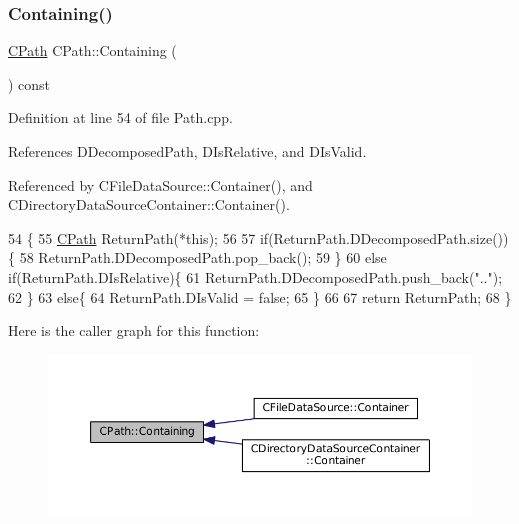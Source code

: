 \subsubsection{\texorpdfstring{Containing()}{Containing()}}
{\footnotesize\ttfamily \hyperlink{classCPath}{C\+Path} C\+Path\+::\+Containing (\begin{DoxyParamCaption}{ }\end{DoxyParamCaption}) const}



Definition at line 54 of file Path.\+cpp.



References D\+Decomposed\+Path, D\+Is\+Relative, and D\+Is\+Valid.



Referenced by C\+File\+Data\+Source\+::\+Container(), and C\+Directory\+Data\+Source\+Container\+::\+Container().


\begin{DoxyCode}
54                              \{
55     \hyperlink{classCPath}{CPath} ReturnPath(*\textcolor{keyword}{this});
56     
57     \textcolor{keywordflow}{if}(ReturnPath.DDecomposedPath.size())\{
58         ReturnPath.DDecomposedPath.pop\_back();
59     \}
60     \textcolor{keywordflow}{else} \textcolor{keywordflow}{if}(ReturnPath.DIsRelative)\{
61         ReturnPath.DDecomposedPath.push\_back(\textcolor{stringliteral}{".."});
62     \}
63     \textcolor{keywordflow}{else}\{
64         ReturnPath.DIsValid = \textcolor{keyword}{false};   
65     \}
66     
67     \textcolor{keywordflow}{return} ReturnPath;
68 \}
\end{DoxyCode}
Here is the caller graph for this function\+:\nopagebreak
\begin{figure}[H]
\begin{center}
\leavevmode
\includegraphics[width=350pt]{classCPath_a24d8c455b1663ce251d3a749437fa4fe_icgraph}
\end{center}
\end{figure}
\hypertarget{classCPath_a5161b834e754b217ddead2437eaaa223}{}\label{classCPath_a5161b834e754b217ddead2437eaaa223} 

